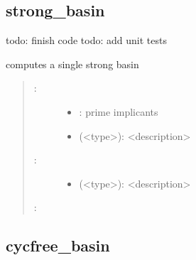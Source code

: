 \documentclass[letterpaper,10pt,english]{sphinxmanual}
\begin{document}
\subsection{strong\_basin}
\label{\detokenize{Basins:id2}}\label{\detokenize{Basins:strong-basin}}

\begin{fulllineitems}
\label{\detokenize{Basins:PyBoolNet.Basins.strong_basin}}
todo: finish code
todo: add unit tests

computes a single strong basin
\begin{quote}
\begin{description}
\item[{:}] \leavevmode\begin{itemize}
\item {} 
: prime implicants

\item {} 
 (\textless{}type\textgreater{}): \textless{}description\textgreater{}

\end{itemize}

\item[{:}] \leavevmode\begin{itemize}
\item {} 
 (\textless{}type\textgreater{}): \textless{}description\textgreater{}

\end{itemize}

\end{description}

:

\begin{sphinxVerbatim}[commandchars=\\\{\}]
\end{sphinxVerbatim}
\end{quote}

\end{fulllineitems}



\subsection{cycfree\_basin}
\label{\detokenize{Basins:cycfree-basin}}\label{\detokenize{Basins:id3}}
\end{document}
